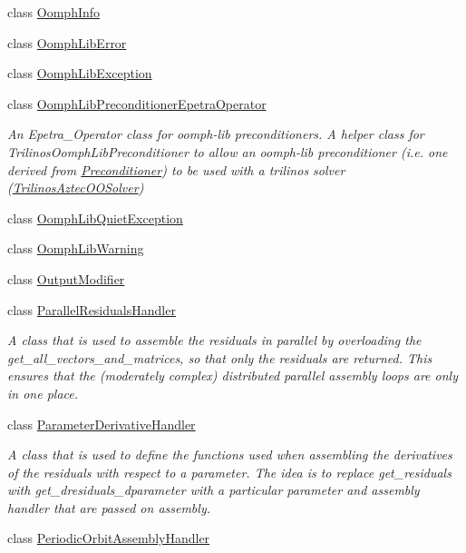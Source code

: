 \begin{DoxyCompactItemize}
class \hyperlink{classoomph_1_1OomphInfo}{Oomph\+Info}
\item 
class \hyperlink{classoomph_1_1OomphLibError}{Oomph\+Lib\+Error}
\item 
class \hyperlink{classoomph_1_1OomphLibException}{Oomph\+Lib\+Exception}
\item 
class \hyperlink{classoomph_1_1OomphLibPreconditionerEpetraOperator}{Oomph\+Lib\+Preconditioner\+Epetra\+Operator}
\begin{DoxyCompactList}\small\item\em An Epetra\+\_\+\+Operator class for oomph-\/lib preconditioners. A helper class for Trilinos\+Oomph\+Lib\+Preconditioner to allow an oomph-\/lib preconditioner (i.\+e. one derived from \hyperlink{classoomph_1_1Preconditioner}{Preconditioner}) to be used with a trilinos solver (\hyperlink{classoomph_1_1TrilinosAztecOOSolver}{Trilinos\+Aztec\+O\+O\+Solver}) \end{DoxyCompactList}\item 
class \hyperlink{classoomph_1_1OomphLibQuietException}{Oomph\+Lib\+Quiet\+Exception}
\item 
class \hyperlink{classoomph_1_1OomphLibWarning}{Oomph\+Lib\+Warning}
\item 
class \hyperlink{classoomph_1_1OutputModifier}{Output\+Modifier}
\item 
class \hyperlink{classoomph_1_1ParallelResidualsHandler}{Parallel\+Residuals\+Handler}
\begin{DoxyCompactList}\small\item\em A class that is used to assemble the residuals in parallel by overloading the get\+\_\+all\+\_\+vectors\+\_\+and\+\_\+matrices, so that only the residuals are returned. This ensures that the (moderately complex) distributed parallel assembly loops are only in one place. \end{DoxyCompactList}\item 
class \hyperlink{classoomph_1_1ParameterDerivativeHandler}{Parameter\+Derivative\+Handler}
\begin{DoxyCompactList}\small\item\em A class that is used to define the functions used when assembling the derivatives of the residuals with respect to a parameter. The idea is to replace get\+\_\+residuals with get\+\_\+dresiduals\+\_\+dparameter with a particular parameter and assembly handler that are passed on assembly. \end{DoxyCompactList}\item 
class \hyperlink{classoomph_1_1PeriodicOrbitAssemblyHandler}{Periodic\+Orbit\+Assembly\+Handler}

\end{DoxyCompactItemize}
